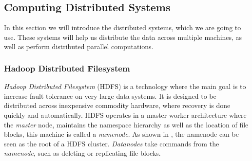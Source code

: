 \subsection{Computing Distributed Systems}\label{sec:distributed}
In this section we will introduce the distributed systems, which we are going to use. These systems will help us distribute the data across multiple machines, as well as perform distributed parallel computations. 

\subsubsection{Hadoop Distributed Filesystem}\label{sec:hadoopfilesystem}
\emph{Hadoop Distributed Filesystem} (HDFS) is a technology where the main goal is to increase fault tolerance on very large data systems. It is designed to be distributed across inexpensive commodity hardware, where recovery is done quickly and automatically. HDFS operates in a master-worker architecture where the \emph{master} node, maintains the namespace hierarchy as well as the location of file blocks, this machine is called a \emph{namenode}. As shown in , the namenode can be seen as the root of a HDFS cluster. \emph{Datanodes} take commands from the \emph{namenode}, such as deleting or replicating file blocks.

